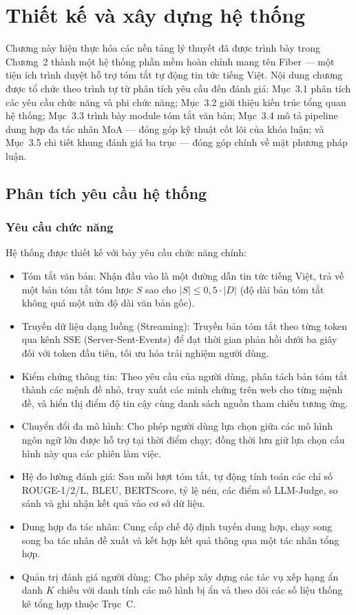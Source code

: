 \chapter{Thiết kế và xây dựng hệ thống}

Chương này hiện thực hóa các nền tảng lý thuyết đã được trình bày trong Chương~2 thành một hệ thống phần mềm hoàn chỉnh mang tên Fiber --- một tiện ích trình duyệt hỗ trợ tóm tắt tự động tin tức tiếng Việt. Nội dung chương được tổ chức theo trình tự từ phân tích yêu cầu đến đánh giá: Mục~3.1 phân tích các yêu cầu chức năng và phi chức năng; Mục~3.2 giới thiệu kiến trúc tổng quan hệ thống; Mục~3.3 trình bày module tóm tắt văn bản; Mục~3.4 mô tả pipeline dung hợp đa tác nhân MoA --- đóng góp kỹ thuật cốt lõi của khóa luận; và Mục~3.5 chi tiết khung đánh giá ba trục --- đóng góp chính về mặt phương pháp luận.

\section{Phân tích yêu cầu hệ thống}

\subsection{Yêu cầu chức năng}

Hệ thống được thiết kế với bảy yêu cầu chức năng chính: 

\begin{itemize}
  \item Tóm tắt văn bản: Nhận đầu vào là một đường dẫn tin tức tiếng Việt, 
        trả về một bản tóm tắt tóm lược $S$ sao cho $|S| \leq 0{,}5 \cdot |D|$ (độ dài bản tóm tắt không quá một nửa độ dài văn bản gốc).
  \item Truyền dữ liệu dạng luồng (Streaming): Truyền bản tóm tắt theo từng token
        qua kênh SSE (Server-Sent-Events) để đạt thời gian phản hồi dưới ba giây đối với token đầu tiên, tối ưu hóa trải nghiệm người dùng.
  \item Kiểm chứng thông tin: Theo yêu cầu của người dùng, phân tách bản tóm tắt thành các 
        mệnh đề nhỏ, truy xuất các minh chứng trên web cho từng mệnh đề, và hiển thị điểm độ tin cậy cùng danh sách nguồn tham chiếu tương ứng.
  \item Chuyển đổi đa mô hình: Cho phép người dùng lựa chọn giữa các mô hình ngôn ngữ lớn 
        được hỗ trợ tại thời điểm chạy; đồng thời lưu giữ lựa chọn cấu hình này qua các phiên làm việc.
  \item Hệ đo lường đánh giá: Sau mỗi lượt tóm tắt, tự động tính toán các chỉ số 
        ROUGE-1/2/L, BLEU, BERTScore, tỷ lệ nén, các điểm số LLM-Judge, so sánh và ghi nhận kết quả vào cơ sở dữ liệu.
  \item Dung hợp đa tác nhân: Cung cấp chế độ định tuyến dung hợp, 
        chạy song song ba tác nhân đề xuất và kết hợp kết quả thông qua một tác nhân tổng hợp.
  \item Quản trị đánh giá người dùng: Cho phép xây dựng các 
        tác vụ xếp hạng ẩn danh $K$ chiều với danh tính các mô hình bị ẩn và theo dõi các số liệu thống kê tổng hợp thuộc Trục~C.
\end{itemize}

